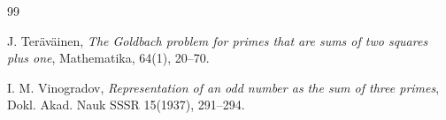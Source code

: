 \documentclass{amsart}
\numberwithin{equation}{subsection}
\begin{document}
\begin{thebibliography}{99}




 J. Ter\"{a}v\"{a}inen, \textit{The Goldbach problem for primes that are sums of two squares plus one}, Mathematika, 64(1), 20--70.


 I. M. Vinogradov, \textit{Representation of an odd number as the sum of three primes}, Dokl. Akad. Nauk SSSR 15(1937), 291--294.

\end{thebibliography}
\end{document}
